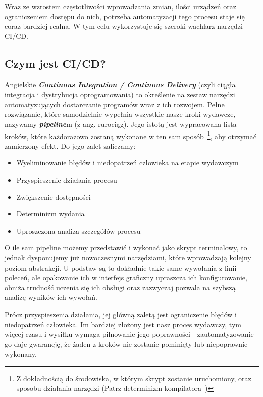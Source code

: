 Wraz ze wzrostem częstotliwości wprowadzania zmian, ilości urządzeń oraz ograniczeniem dostępu do nich,
potrzeba automatyzacji tego procesu staje się coraz bardziej realna. 
W tym celu wykorzystuje się szeroki wachlarz narzędzi CI/CD. \todo{}

\subsection{Czym jest CI/CD?}
Angielskie \textbf{\textit{Continous Integration / Continous Delivery}} (czyli ciągła integracja i dystrybucja oprogramowania) 
to określenie na zestaw narzędzi automatyzujących dostarczanie programów wraz z ich rozwojem. 
Pełne rozwiązanie, które samodzielnie wypełnia wszystkie nasze kroki wydawcze, nazywamy \textbf{\textit{pipeline}}m (z ang. rurociąg).
Jego istotą jest wypracowana lista kroków, które każdorazowo zostaną wykonane w ten sam sposób~\footnote[1]{
    \label{determinismFootnote}
    Z dokładnością do środowiska, w którym skrypt zostanie uruchomiony, 
    oraz sposobu działania narzędzi (Patrz determinizm kompilatora~\cite{compilerDeterminism})
}, aby otrzymać zamierzony efekt.
Do jego zalet zaliczamy:
\begin{itemize}
    \item Wyeliminowanie błędów i niedopatrzeń człowieka na etapie wydawczym
    \item Przyspieszenie działania procesu
    \item Zwiększenie dostępności 
    \item Determinizm wydania~
    \item Uproszczona analiza szczegółów procesu
\end{itemize}

O ile sam pipeline możemy przedstawić i wykonać jako skrypt terminalowy, 
to jednak dysponujemy już nowoczesnymi narzędziami, które wprowadzają kolejny poziom abstrakcji.
U podstaw są to dokładnie takie same wywołania z linii poleceń, ale opakowanie ich w interfejs graficzny 
upraszcza ich konfigurowanie, obniża trudność uczenia się ich obsługi oraz zazwyczaj pozwala na szybszą analizę 
wyników ich wywołań.

Prócz przyspieszenia działania, jej główną zaletą jest ograniczenie błędów i niedopatrzeń człowieka.
Im bardziej złożony jest nasz proces wydawczy, tym więcej czasu i wysiłku wymaga pilnowanie jego poprawności -
zautomatyzowanie go daje gwarancję, że żaden z kroków nie zostanie pominięty lub niepoprawnie wykonany.

